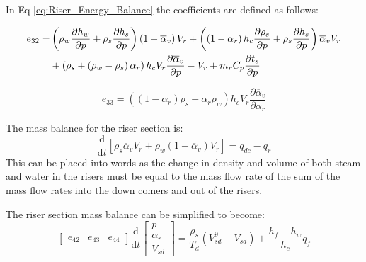         \clearpage
    
        In Eq \ref{eq:Riser_Energy_Balance} the coefficients are defined as follows:
        
        
        
        \begin{equation*}
            \aligned
                e_{32}  =& \left ( \rho_w \frac{\partial h_w }{\partial p} + \rho_s \frac{\partial h_s }{\partial p}\right )\left ( 1-\overline{\alpha}_v \right )V_r + \left ( \left ( 1- \alpha_r \right ) h_c \frac{\partial \rho_s }{\partial p} + \rho_s \frac{\partial h_s }{\partial p} \right ) \overline{\alpha}_v V_r \\
                         &+  \left (  \rho_s + \left ( \rho_w - \rho_s \right )\alpha_r \right ) h_c V_r \frac{\partial \overline{\alpha}_v }{\partial p}  - V_r+m_r C_p \frac{\partial t_s }{\partial p}
                \endaligned
        \end{equation*}
        

        \begin{equation*}
            e_{33}  = \left ( \left ( 1-\alpha_r \right )\rho_s + \alpha_r \rho_w \right )h_c V_r \frac{\partial \overline{\alpha}_v }{\partial \alpha_r} 
        \end{equation*}
        
        The mass balance for the riser section is:
        $$\frac{\mathrm{d} }{\mathrm{d} t}\left [ \rho_s \overline{\alpha}_v V_{r} + \rho_w \left ( 1 - \overline{\alpha}_v \right )V_{r} \right ] = q_{dc}-q_{r} $$\cite{Astrom}
        This can be placed into words as the change in density and volume of both steam and water in the risers must be equal to the mass flow rate of the sum of the mass flow rates into the down comers and out of the risers.  
        
        The riser section mass balance can be simplified to become:
        \begin{equation}
            \label{eq:Riser_Mass_Balance}
            \left [ \begin{matrix}  e_{42}& e_{43}& e_{44}\end{matrix} \right ] \frac{\mathrm{d} }{\mathrm{d} t} \left [ \begin{matrix} p\\ \alpha_r\\ V_{sd}\end{matrix} \right ] = \frac{\rho_s}{T_d}  \left ( V_{sd}^0  - V_{sd}\right ) + \frac{h_f - h_w}{h_c}q_f
        \end{equation}
        
